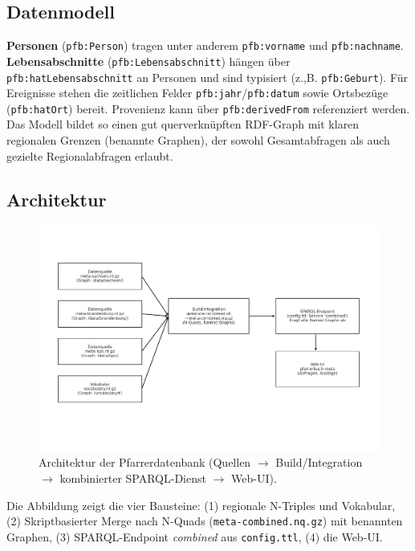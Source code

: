 \subsection{Datenmodell}
\textbf{Personen} (\texttt{pfb:Person}) tragen unter anderem \texttt{pfb:vorname} und \texttt{pfb:nachname}. \textbf{Lebensabschnitte}
(\texttt{pfb:Lebensabschnitt}) hängen über \texttt{pfb:hatLebensabschnitt} an Personen und sind typisiert
(z.,B. \texttt{pfb:Geburt}). Für Ereignisse stehen die zeitlichen Felder \texttt{pfb:jahr}/\texttt{pfb:datum} sowie Ortsbezüge
(\texttt{pfb:hatOrt}) bereit. Provenienz kann über \texttt{pfb:derivedFrom} referenziert werden. Das Modell bildet so einen gut querverknüpften RDF-Graph mit klaren regionalen Grenzen (benannte Graphen), der sowohl Gesamtabfragen als auch gezielte Regionalabfragen erlaubt.

\subsection{Architektur}
\begin{figure}[h]
\centering
\includegraphics[width=\linewidth]{Abbildungen/Aufbau_Pfarrerdatenbank.jpg}
\caption{Architektur der Pfarrerdatenbank (Quellen $\rightarrow$ Build/Integration $\rightarrow$ kombinierter SPARQL-Dienst $\rightarrow$ Web-UI).}
\label{fig:pfarrer-architektur}
\end{figure}

\noindent Die Abbildung zeigt die vier Bausteine: (1) regionale N-Triples und Vokabular, (2) Skriptbasierter Merge nach N-Quads
(\texttt{meta-combined.nq.gz}) mit benannten Graphen, (3) SPARQL-Endpoint \emph{combined} aus \texttt{config.ttl}, (4) die Web-UI.

